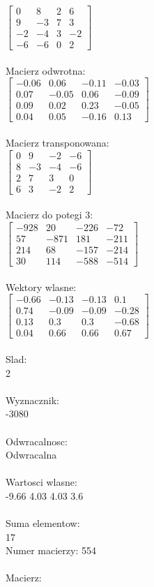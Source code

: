\documentclass[a4paper,12pt]{article}
\begin{document}
$\begin{bmatrix} 0&8&2&6\\9&-3&7&3\\-2&-4&3&-2\\-6&-6&0&2 \end{bmatrix}$
\\
\\
Macierz odwrotna:\\

$\begin{bmatrix} -0.06&0.06&-0.11&-0.03\\0.07&-0.05&0.06&-0.09\\0.09&0.02&0.23&-0.05\\0.04&0.05&-0.16&0.13 \end{bmatrix}$
\\
\\
Macierz transponowana:\\

$\begin{bmatrix} 0&9&-2&-6\\8&-3&-4&-6\\2&7&3&0\\6&3&-2&2 \end{bmatrix}$
\\
\\
Macierz do potegi 3:\\

$\begin{bmatrix} -928&20&-226&-72\\57&-871&181&-211\\214&68&-157&-214\\30&114&-588&-514 \end{bmatrix}$
\\
\\
Wektory wlasne:\\

$\begin{bmatrix} -0.66&-0.13&-0.13&0.1\\0.74&-0.09&-0.09&-0.28\\0.13&0.3&0.3&-0.68\\0.04&0.66&0.66&0.67 \end{bmatrix}$
\\
\\
Slad:\\
2
\\
\\
Wyznacznik:\\
-3080
\\
\\
Odwracalnosc:\\
Odwracalna
\\
\\
Wartosci wlasne:\\
-9.66 4.03 4.03 3.6
\\
\\
Suma elementow:\\
17
\\
\newpage
Numer macierzy:
554
\\
\\
Macierz:\\
\end{document}
